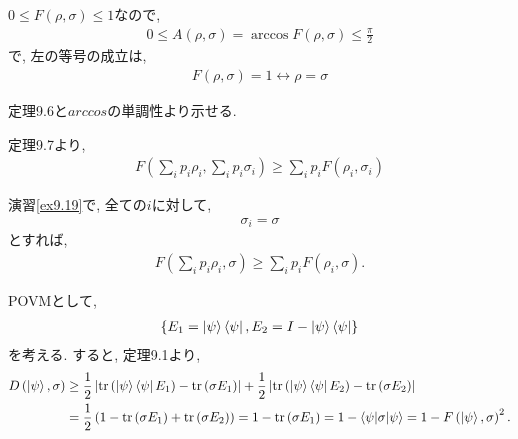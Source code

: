 \begin{ex}
    \label{ex9.17}
    $0 \leq F\left( \rho, \sigma\right) \leq 1$なので,
    \begin{align*}
        0 \leq A(\rho, \sigma) =  \arccos F\left( \rho, \sigma\right) \leq \frac{\pi}{2}
    \end{align*}
    で, 左の等号の成立は,
    \begin{align*}
        F\left( \rho, \sigma\right) = 1
        \leftrightarrow
        \rho = \sigma
    \end{align*}
\end{ex}

\begin{ex}
    \label{ex9.18}
    定理9.6と$arccos$の単調性より示せる.
\end{ex}

\begin{ex}
    \label{ex9.19}
    定理9.7より,
    \begin{align*}
        F \left( \sum_i p_i \rho_i , \sum_i p_i \sigma_i \right)
        \geq
        \sum_i p_i F(\rho_i, \sigma_i)
    \end{align*}
\end{ex}

\begin{ex}
    \label{ex9.20}
    演習\ref{ex9.19}で, 全ての$i$に対して,
    \begin{align*}
        \sigma_i = \sigma
    \end{align*}
    とすれば,
    \begin{align*}
        F \left( \sum_i p_i \rho_i , \sigma \right)
        \geq
        \sum_i p_i F(\rho_i, \sigma).
    \end{align*}
\end{ex}

\begin{ex}
    \label{ex9.21}
    POVMとして,
    \begin{align*}
        \{E_1 = \ket{\psi}\bra{\psi}, E_2 = I - \ket{\psi}\bra{\psi}\}
    \end{align*}
    を考える. すると, 定理9.1より,
    \begin{align*}
        D \left( \ket{\psi}, \sigma\right)
         & \geq
        \frac{1}{2}
        \left|
        \mathrm{tr}\left( \ket{\psi}\bra{\psi}E_1\right)
        -
        \mathrm{tr}\left( \sigma E_1\right)
        \right|
        +
        \frac{1}{2}
        \left|
        \mathrm{tr}\left( \ket{\psi}\bra{\psi}E_2\right)
        -
        \mathrm{tr}\left( \sigma E_2\right)
        \right|
        \\
         & =
        \frac{1}{2}
        \left(
        1
        -
        \mathrm{tr}\left( \sigma E_1\right)
        +
        \mathrm{tr}\left( \sigma E_2\right)
        \right)
        =
        1 - \mathrm{tr}\left( \sigma E_1\right)
        =
        1 - \braket{\psi|\sigma|\psi}
        =
        1 - F\left( \ket{\psi}, \sigma\right)^2.
    \end{align*}
\end{ex}

